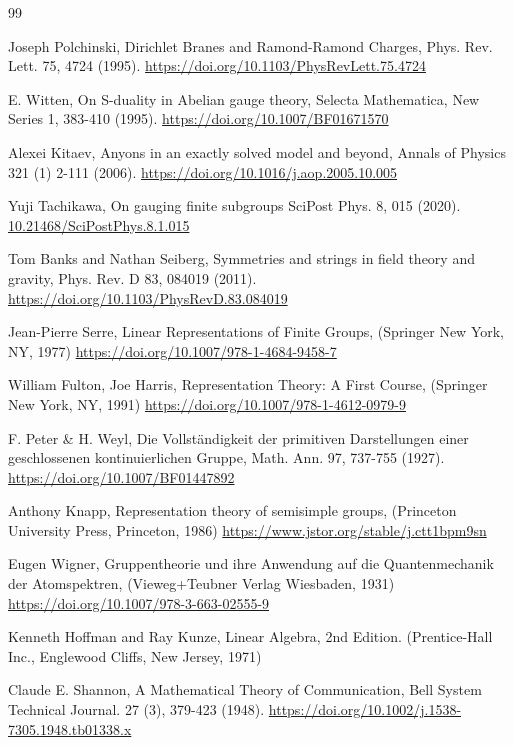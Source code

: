 \documentclass[12pt,a4paper]{article}
\begin{document}
\begin{thebibliography}{99}
	
	Joseph Polchinski,
	Dirichlet Branes and Ramond-Ramond Charges,
	Phys. Rev. Lett. 75, 4724 (1995).
	\url{https://doi.org/10.1103/PhysRevLett.75.4724}
	
	
	E. Witten,
	On S-duality in Abelian gauge theory,
	Selecta Mathematica, New Series 1, 383-410 (1995).
	\url{https://doi.org/10.1007/BF01671570}
	
		
	Alexei Kitaev,
	Anyons in an exactly solved model and beyond,
	Annals of Physics 321 (1) 2-111 (2006).
	\url{https://doi.org/10.1016/j.aop.2005.10.005}
	
	
	Yuji Tachikawa,
	On gauging finite subgroups
	SciPost Phys. 8, 015 (2020).
	\href{https://scipost.org/10.21468/SciPostPhys.8.1.015}{10.21468/SciPostPhys.8.1.015}
	
	
	Tom Banks and Nathan Seiberg,
	Symmetries and strings in field theory and gravity,
	Phys. Rev. D 83, 084019 (2011).
	\url{https://doi.org/10.1103/PhysRevD.83.084019}
	
	
	Jean-Pierre Serre,
	Linear Representations of Finite Groups,
	(Springer New York, NY, 1977)
	\url{https://doi.org/10.1007/978-1-4684-9458-7}
	
	
	William Fulton, Joe Harris,
	Representation Theory: A First Course,
	(Springer New York, NY, 1991)
	\url{https://doi.org/10.1007/978-1-4612-0979-9}
	
	
	F. Peter \& H. Weyl,
	Die Vollständigkeit der primitiven Darstellungen einer geschlossenen kontinuierlichen Gruppe, 
	Math. Ann. 97, 737-755 (1927). 
	\url{https://doi.org/10.1007/BF01447892}
	
	
	Anthony Knapp,
	Representation theory of semisimple groups,
	(Princeton University Press, Princeton, 1986)
	\url{https://www.jstor.org/stable/j.ctt1bpm9sn}
	
	
	Eugen Wigner, 
	Gruppentheorie und ihre Anwendung auf die Quantenmechanik der Atomspektren,
	(Vieweg+Teubner Verlag Wiesbaden, 1931)
	\url{https://doi.org/10.1007/978-3-663-02555-9}
	
	
	Kenneth Hoffman and Ray Kunze,
	Linear Algebra, 2nd Edition.
	(Prentice-Hall Inc., Englewood Cliffs, New Jersey, 1971)
	
	
	Claude E. Shannon, 
	A Mathematical Theory of Communication,
	Bell System Technical Journal. 27 (3), 379-423 (1948).
	\url{https://doi.org/10.1002/j.1538-7305.1948.tb01338.x}
	

\end{thebibliography}
\end{document}
